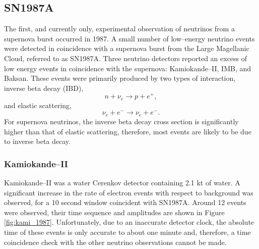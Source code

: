 \subsection{SN1987A}

The first, and currently only, experimental observation of neutrinos from a 
supernova burst occurred in 1987. A small number of low--energy neutrino 
events were detected in coincidence with a supernova burst from the Large 
Magellanic Cloud, referred to as SN1987A. Three neutrino detectors reported an 
excess of low energy events in coincidence with the supernova: Kamiokande--II, 
IMB, and Baksan\cite{Hirata:1987hu, PhysRevLett.58.1494, Loredo:2001rx}. These 
events were primarily produced by two types of interaction, inverse beta decay 
(IBD),
\begin{equation*}
	n + \nu_e \rightarrow p + e^+,
\end{equation*}
and elastic scattering,
\begin{equation*}
	\nu_e + e^- \rightarrow \nu_e + e^-.
\end{equation*}
For supernova neutrinos, the inverse beta decay cross section is significantly 
higher than that of elastic scattering, therefore, most events are likely to be
due to inverse beta decay.

\subsubsection{Kamiokande--II}
Kamiokande--II was a water Cerenkov detector containing 2.1 kt of water. A
significant increase in the rate of electron events with respect to background
was observed, for a 10 second window coincident with 
SN1987A\cite{Hirata:1987hu}. Around 12 events were observed, their time sequence
and amplitudes are shown in Figure \ref{fig:kami_1987}. Unfortunately, due to 
an inaccurate detector clock, the absolute time of these events is only 
accurate to about one minute and, therefore, a time coincidence check with the 
other neutrino observations cannot be made.

